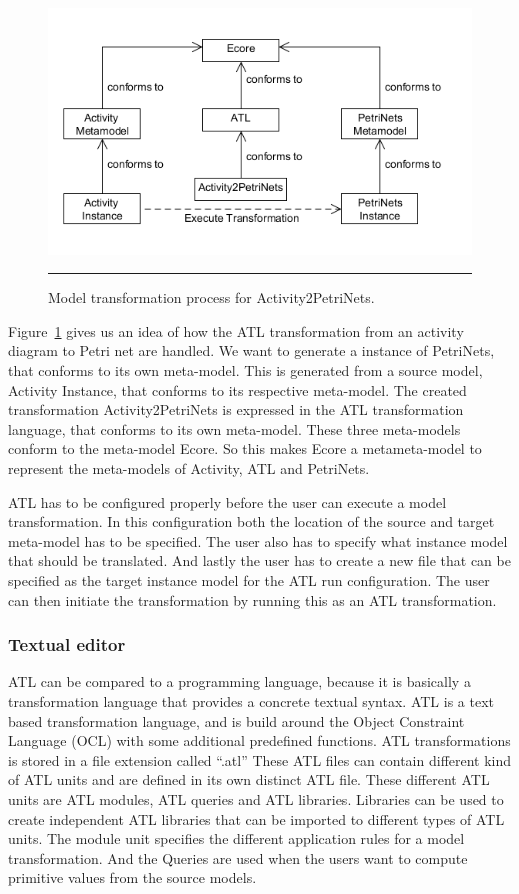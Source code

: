 \begin{figure}[H]
	\centering
	\includegraphics[scale=0.55]{figures/ATL.png}
	\rule{35em}{0.5pt}
	\caption[Model transformation for Atlas transformation language]
	{Model transformation process for Activity2PetriNets.}
	\label{fig:ATL}
\end{figure}

Figure~\ref{fig:ATL} gives us an idea of how the ATL transformation from an activity
diagram to Petri net are handled. We want to generate a instance of PetriNets,
that conforms to its own meta-model. This is generated from a source
model, Activity Instance, that conforms to its respective meta-model.
The created transformation Activity2PetriNets is expressed in the ATL
transformation  language, that conforms to its own meta-model. These three
meta-models conform to the meta-model Ecore. So this makes Ecore a metameta-model
to represent the meta-models of Activity, ATL and PetriNets.

ATL has to be configured properly before the user can execute a model
transformation. In this configuration both the location of the source and target
meta-model has to be specified. The user also has to specify what instance model
that should be translated. And lastly the user has to create a new file that can
be specified as the target instance model for the ATL run configuration. The
user can then initiate the transformation by running this as an ATL
transformation.


\subsubsection*{Textual editor}

ATL can be compared to a programming language, because it is
basically a transformation language that provides a concrete textual syntax. ATL
is a text based transformation language, and is build around the Object
Constraint Language (OCL) \cite{OCL} with some additional predefined functions.
ATL transformations is stored in a file extension called ``.atl'' These ATL
files can contain different kind of ATL units and are defined in its own
distinct ATL file. These different ATL units are ATL modules, ATL queries and
ATL libraries. Libraries can be used to create independent ATL libraries that
can be imported to different types of ATL units. The module unit specifies the
different application rules for a  model transformation. And the Queries are
used when the users want to compute primitive values from the source models.

